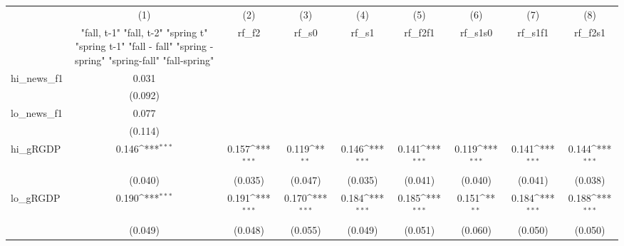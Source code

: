 {
\def\sym#1{\ifmmode^{#1}\else\(^{#1}\)\fi}
\begin{tabular}{l*{8}{c}}
\toprule
            &\multicolumn{1}{c}{(1)}&\multicolumn{1}{c}{(2)}&\multicolumn{1}{c}{(3)}&\multicolumn{1}{c}{(4)}&\multicolumn{1}{c}{(5)}&\multicolumn{1}{c}{(6)}&\multicolumn{1}{c}{(7)}&\multicolumn{1}{c}{(8)}\\
            &\multicolumn{1}{c}{  "fall, t-1" "fall, t-2" "spring t" "spring t-1"  "fall - fall" "spring - spring" "spring-fall" "fall-spring" }&\multicolumn{1}{c}{rf\_f2}&\multicolumn{1}{c}{rf\_s0}&\multicolumn{1}{c}{rf\_s1}&\multicolumn{1}{c}{rf\_f2f1}&\multicolumn{1}{c}{rf\_s1s0}&\multicolumn{1}{c}{rf\_s1f1}&\multicolumn{1}{c}{rf\_f2s1}\\
\midrule
hi\_news\_f1  &       0.031         &                     &                     &                     &                     &                     &                     &                     \\
            &     (0.092)         &                     &                     &                     &                     &                     &                     &                     \\
\addlinespace
lo\_news\_f1  &       0.077         &                     &                     &                     &                     &                     &                     &                     \\
            &     (0.114)         &                     &                     &                     &                     &                     &                     &                     \\
\addlinespace
hi\_gRGDP    &       0.146\sym{***}&       0.157\sym{***}&       0.119\sym{**} &       0.146\sym{***}&       0.141\sym{***}&       0.119\sym{***}&       0.141\sym{***}&       0.144\sym{***}\\
            &     (0.040)         &     (0.035)         &     (0.047)         &     (0.035)         &     (0.041)         &     (0.040)         &     (0.041)         &     (0.038)         \\
\addlinespace
lo\_gRGDP    &       0.190\sym{***}&       0.191\sym{***}&       0.170\sym{***}&       0.184\sym{***}&       0.185\sym{***}&       0.151\sym{**} &       0.184\sym{***}&       0.188\sym{***}\\
            &     (0.049)         &     (0.048)         &     (0.055)         &     (0.049)         &     (0.051)         &     (0.060)         &     (0.050)         &     (0.050)         \\

\end{tabular}}
